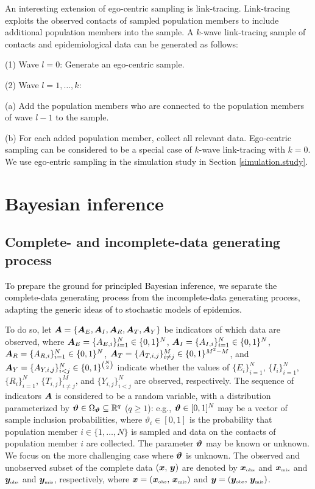 \documentclass[12pt,usenatbib,referee]{article}
\renewcommand{\alert}{\textcolor{black}}
\begin{document}
An interesting extension of ego-centric sampling is link-tracing.
Link-tracing exploits the observed contacts of sampled population members to include additional population members into the sample.
A $k$-wave link-tracing sample of contacts and epidemiological data can be generated as follows:
\bi
\item[(1)] Wave $l = 0$: Generate an ego-centric sample.
\item[(2)] Wave $l = 1, \dots, k$:
\bi
\item[(a)] Add the population members who are connected to the population members of wave $l - 1$ to the sample.
\item[(b)] For each added population member,
collect all relevant data.
\ei
\ei
Ego-centric sampling can be considered to be a special case of $k$-wave link-tracing with $k = 0$.
We use ego-entric sampling in the simulation study in Section \ref{simulation.study}.

\section{Bayesian inference}
\label{bay}

\alert{}

\subsection{Complete- and incomplete-data generating process}
\label{likelihood.ignorable}

\alert{To prepare the ground for principled Bayesian inference,
we separate the complete-data generating process from the incomplete-data generating process,
adapting the generic ideas of \citet{Ru76} to stochastic models of epidemics.}

To do so,
let $\bm{A} = \{\bm{A}_E, \bm{A}_I, \bm{A}_R, \bm{A}_T, \bm{A}_Y\}$ be indicators of which data are observed,
where $\bm{A}_E = \{A_{E,i}\}_{i=1}^N \in \{0, 1\}^N$,
$\bm{A}_I = \{A_{I,i}\}_{i=1}^N \in \{0, 1\}^N$,
$\bm{A}_R = \{A_{R,i}\}_{i=1}^N \in \{0, 1\}^N$,\linebreak
$\bm{A}_T = \{A_{T,i,j}\}_{i \neq j}^M  \in \{0, 1\}^{M^2-M}$, 
and $\bm{A}_Y = \{A_{Y,i,j}\}_{i<j}^N \in \{0, 1\}^{\binom{N}{2}}$ indicate whether the values of 
$\{E_i\}_{i=1}^N$, $\{I_i\}_{i=1}^N$, $\{R_i\}_{i=1}^N$, $\{T_{i,j}\}_{i \neq j}^M$, and $\{Y_{i,j}\}_{i<j}^N$ are observed,
respectively.
The sequence of indicators $\bm{A}$ is considered to be a random variable,
with a distribution parameterized by $\boldsymbol{\vartheta} \in \Omega_{\boldsymbol{\vartheta}} \subseteq \mathbb{R}^q$ ($q \geq 1$):
e.g.,
$\boldsymbol{\vartheta} \in [0, 1]^N$ may be a vector of sample inclusion probabilities,
where $\vartheta_i \in [0, 1]$ is the probability that population member $i \in \{1, \dots, N\}$ is sampled and data on the contacts of population member $i$ are collected.
The parameter $\boldsymbol{\vartheta}$ may be known or unknown.
We focus on the more challenging case where $\boldsymbol{\vartheta}$ is unknown.
The observed and unobserved subset of the complete data $(\bm{x},\, \bm{y})$ are denoted by $\bm{x}_{\mbox{\tiny obs}}$ and $\bm{x}_{\mbox{\tiny mis}}$ and $\bm{y}_{\mbox{\tiny obs}}$ and $\bm{y}_{\mbox{\tiny mis}}$,
respectively,
where $\bm{x} = (\bm{x}_{\mbox{\tiny obs}},\, \bm{x}_{\mbox{\tiny mis}})$ and $\bm{y} = (\bm{y}_{\mbox{\tiny obs}},\, \bm{y}_{\mbox{\tiny mis}})$.
\end{document}
